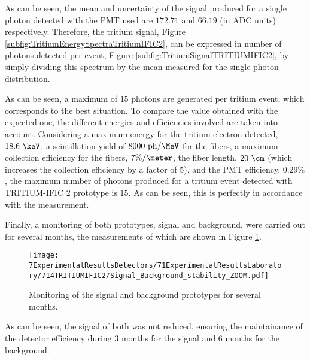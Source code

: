 As can be seen, the mean and uncertainty of the signal produced for a single photon detected with the PMT used are $172.71$ and $66.19$ (in ADC units) respectively. Therefore, the tritium signal, Figure \ref{subfig:TritiumEnergySpectraTritiumIFIC2}, can be expressed in number of photons detected per event, Figure \ref{subfig:TritiumSignalTRITIUMIFIC2}, by simply dividing this spectrum by the mean measured for the single-photon distribution.


As can be seen, a maximum of $15$ photons are generated per tritium event, which corresponds to the best situation. To compare the value obtained with the expected one, the different energies and efficiencies involved are taken into account. Considering a maximum energy for the tritium electron detected, $18.6~\keV$, a scintillation yield of $8000~\text{ph}/\MeV$ for the fibers, a maximum collection efficiency for the fibers, $7\%/\meter$, the fiber length, $20~\cm$ (which increases the collection efficiency by a factor of 5), and the PMT efficiency, $0.29\%$, the maximum number of photons produced for a tritium event detected with TRITIUM-IFIC 2 prototype is $15$. As can be seen, this is perfectly in accordance with the measurement.

Finally, a monitoring of both prototypes, signal and background, were carried out for several months, the measurements of which are shown in Figure \ref{fig:MonitorizationTRITIUMIFIC2}.

\begin{figure}[h]
\centering
\texttt{[image: 7ExperimentalResultsDetectors/71ExperimentalResultsLaboratory/714TRITIUMIFIC2/Signal\_Background\_stability\_ZOOM.pdf]}
\caption{Monitoring of the signal and background prototypes for several months.\label{fig:MonitorizationTRITIUMIFIC2}}
\end{figure}

As can be seen, the signal of both was not reduced, ensuring the maintainance of the detector efficiency during 3 months for the signal and 6 months for the background.







